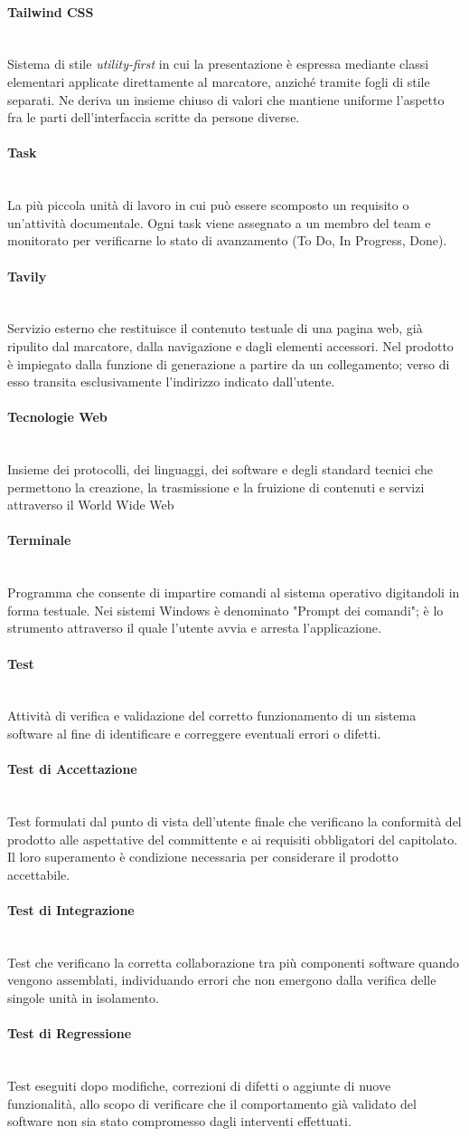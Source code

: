 \documentclass[a4paper, 10pt, colorlinks=true, linkcolor=black, urlcolor=blue, citecolor=blue, hidelinks]{article}
\newcommand{\glossaryterm}[2]{
    \paragraph{#1 \label{term:#1}} \mbox{} \\
    #2
    \vspace{0.5em}
}
\begin{document}
\glossaryterm{Tailwind CSS}{Sistema di stile \textit{utility-first} in cui la presentazione è espressa mediante classi elementari applicate direttamente al marcatore, anziché tramite fogli di stile separati. Ne deriva un insieme chiuso di valori che mantiene uniforme l'aspetto fra le parti dell'interfaccia scritte da persone diverse.}

\glossaryterm{Task}{La più piccola unità di lavoro in cui può essere scomposto un requisito o un'attività documentale. Ogni task viene assegnato a un membro del team e monitorato per verificarne lo stato di avanzamento (To Do, In Progress, Done).}

\glossaryterm{Tavily}{Servizio esterno che restituisce il contenuto testuale di una pagina web, già ripulito dal marcatore, dalla navigazione e dagli elementi accessori. Nel prodotto è impiegato dalla funzione di generazione a partire da un collegamento; verso di esso transita esclusivamente l'indirizzo indicato dall'utente.}

\glossaryterm{Tecnologie Web}{Insieme dei protocolli, dei linguaggi, dei software e degli standard tecnici che permettono la creazione, la trasmissione e la fruizione di contenuti e servizi attraverso il World Wide Web}

\glossaryterm{Terminale}{Programma che consente di impartire comandi al sistema operativo digitandoli in forma testuale. Nei sistemi Windows è denominato "Prompt dei comandi"; è lo strumento attraverso il quale l'utente avvia e arresta l'applicazione.}

\glossaryterm{Test}{Attività di verifica e validazione del corretto funzionamento di un sistema software al fine di identificare e correggere eventuali errori o difetti.}

\glossaryterm{Test di Accettazione}{Test formulati dal punto di vista dell'utente finale che verificano la conformità del prodotto alle aspettative del committente e ai requisiti obbligatori del capitolato. Il loro superamento è condizione necessaria per considerare il prodotto accettabile.}

\glossaryterm{Test di Integrazione}{Test che verificano la corretta collaborazione tra più componenti software quando vengono assemblati, individuando errori che non emergono dalla verifica delle singole unità in isolamento.}

\glossaryterm{Test di Regressione}{Test eseguiti dopo modifiche, correzioni di difetti o aggiunte di nuove funzionalità, allo scopo di verificare che il comportamento già validato del software non sia stato compromesso dagli interventi effettuati.}
\end{document}

